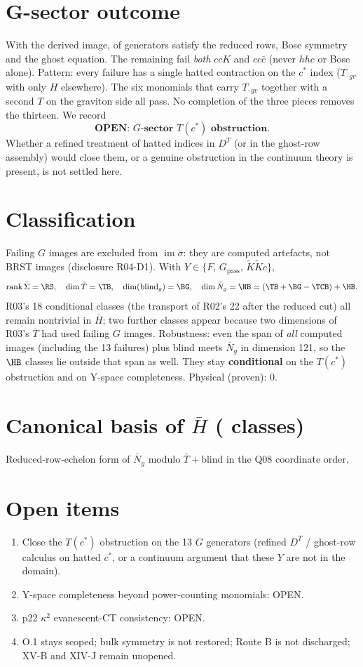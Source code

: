 \documentclass[11pt]{article}
\begin{document}
\section{G-sector outcome}
With the derived image, \NP{} of \NGens{} generators satisfy the reduced rows, Bose symmetry and the ghost equation.
The remaining \NF{} fail \emph{both} $ccK$ and $cc\bar c$ (never $hhc$ or Bose alone). Pattern: every failure has a
single hatted contraction on the $c^*$ index ($T_{\cdot\,gv}$ with only $H$ elsewhere). The six monomials that carry
$T_{\cdot\,gv}$ together with a second $T$ on the graviton side all pass. No completion of the three pieces removes
the thirteen. We record
\[ \textbf{OPEN: $G$-sector $T(c^*)$ obstruction.} \]
Whether a refined treatment of hatted indices in $D^T$ (or in the ghost-row assembly) would close them, or a genuine
obstruction in the continuum theory is present, is not settled here.

\section{Classification}
Failing $G$ images are excluded from $\operatorname{im}\bar\sigma$: they are computed artefacts, not BRST images
(disclosure R04-D1). With $Y\in\{F,\,G_{\mathrm{pass}},\,\tilde K\tilde K c\}$,
\[ \operatorname{rank}\bar\Sigma=\RS,\quad \dim\bar T=\TB,\quad \dim(\mathrm{blind}_g)=\BG,\quad
   \dim\bar N_g=\NB = (\TB+\BG-\TCB)+\HB . \]
R03's 18 conditional classes (the transport of R02's 22 after the reduced cut) all remain nontrivial in $\bar H$; two
further classes appear because two dimensions of R03's $\bar T$ had used failing $G$ images. Robustness: even the span of
\emph{all} computed images (including the 13 failures) plus blind meets $\bar N_g$ in dimension 121, so the $\HB$ classes
lie outside that span as well. They stay \textbf{conditional} on the $T(c^*)$ obstruction and on Y-space completeness.
Physical (proven): 0.

\section{Canonical basis of $\bar H$ (\HB{} classes)}
Reduced-row-echelon form of $\bar N_g$ modulo $\bar T+$blind in the Q08 coordinate order.


\section{Open items}
\begin{enumerate}
\item Close the $T(c^*)$ obstruction on the 13 $G$ generators (refined $D^T$ / ghost-row calculus on hatted $c^*$, or a
      continuum argument that these $Y$ are not in the domain).
\item Y-space completeness beyond power-counting monomials: OPEN.
\item p22 $\kappa^2$ evanescent-CT consistency: OPEN.
\item O.1 stays scoped; bulk symmetry is not restored; Route B is not discharged; XV-B and XIV-J remain unopened.
\end{enumerate}
\end{document}
